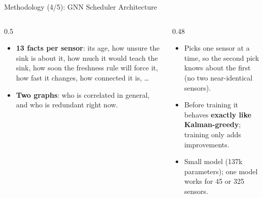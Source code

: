 \documentclass[aspectratio=169,10pt,xcolor=table]{beamer}
\begin{document}
\begin{frame}{Methodology (4/5): GNN Scheduler Architecture}
  \vspace{0.4em}
  \begin{columns}[T]
    \begin{column}{0.5\textwidth}
      \begin{itemize}\scriptsize
        \item \textbf{13 facts per sensor}: its age, how unsure the sink is about it, how much it would teach the sink,
              how soon the freshness rule will force it, how fast it changes, how connected it is, \dots
        \item \textbf{Two graphs}: who is correlated in general, and who is redundant right now.
      \end{itemize}
    \end{column}
    \begin{column}{0.48\textwidth}
      \begin{itemize}\scriptsize
        \item Picks one sensor at a time, so the second pick knows about the first (no two near-identical sensors).
        \item Before training it behaves \textbf{exactly like Kalman-greedy}; training only adds improvements.
        \item Small model (137k parameters); one model works for 45 or 325 sensors.
      \end{itemize}
    \end{column}
  \end{columns}
\end{frame}
\end{document}
